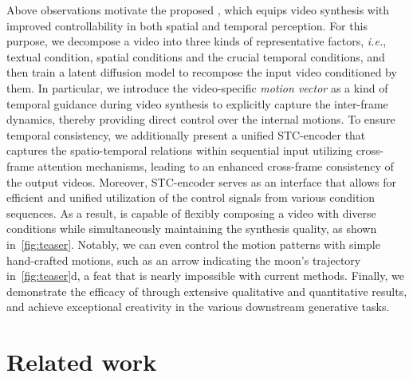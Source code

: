 Above observations motivate the proposed \method, which equips video synthesis with improved controllability in both spatial and temporal perception.
For this purpose, we decompose a video into three kinds of representative factors, \emph{i.e.}, textual condition, spatial conditions and the crucial temporal conditions, and then train a latent diffusion model to recompose the input video conditioned by them.
In particular, we introduce the video-specific \emph{motion vector} as a kind of temporal guidance during video synthesis to explicitly capture the inter-frame dynamics, thereby providing direct control over the internal motions.
To ensure temporal consistency, we additionally present a unified STC-encoder that captures the spatio-temporal relations within sequential input utilizing cross-frame attention mechanisms, leading to an enhanced cross-frame consistency of the output videos.
Moreover, STC-encoder serves as an interface that allows for efficient and unified utilization of the control signals from various condition sequences.
As a result, \method is capable of flexibly composing a video with diverse conditions while simultaneously maintaining the synthesis quality, as shown in~\cref{fig:teaser}.
Notably, we can even control the motion patterns with simple hand-crafted motions, such as an arrow indicating the moon's trajectory in~\cref{fig:teaser}d, a feat that is nearly impossible with current methods.
Finally, we demonstrate the efficacy of \method through extensive qualitative and quantitative results, and achieve exceptional creativity in the various downstream generative tasks.

\section{Related work}

